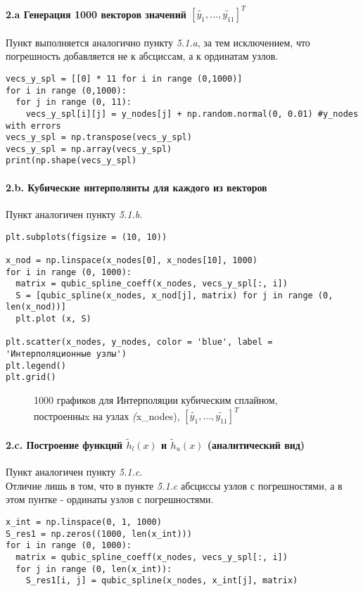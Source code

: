 \paragraph{2.a Генерация 1000 векторов значений $[\tilde{y_1}, ..., \tilde{y_{11}}]^T$ \\} 
\begin{flushleft}
Пункт выполняется аналогично пункту \textit{5.1.a}, за тем исключением, что погрешность добавляется не к абсциссам, а к ординатам узлов.
\end{flushleft}
\begin{lstlisting}
vecs_y_spl = [[0] * 11 for i in range (0,1000)]
for i in range (0,1000):
  for j in range (0, 11):
    vecs_y_spl[i][j] = y_nodes[j] + np.random.normal(0, 0.01) #y_nodes with errors 
vecs_y_spl = np.transpose(vecs_y_spl)
vecs_y_spl = np.array(vecs_y_spl)
print(np.shape(vecs_y_spl)
\end{lstlisting}
\paragraph{2.b. Кубические интерполянты для каждого из векторов \\ }
\begin{flushleft}
Пункт аналогичен пункту \textit{5.1.b}.
\end{flushleft}
\begin{lstlisting}
plt.subplots(figsize = (10, 10))

x_nod = np.linspace(x_nodes[0], x_nodes[10], 1000)
for i in range (0, 1000):
  matrix = qubic_spline_coeff(x_nodes, vecs_y_spl[:, i])
  S = [qubic_spline(x_nodes, x_nod[j], matrix) for j in range (0, len(x_nod))]
  plt.plot (x, S)

plt.scatter(x_nodes, y_nodes, color = 'blue', label = 'Интерполяционные узлы')
plt.legend()
plt.grid()
\end{lstlisting}
\clearpage
\begin{figure}[h]
\caption{1000 графиков для Интерполяции кубическим сплайном, построенныx на узлах \textit(x_nodes), $[\tilde{y_1}, ..., \tilde{y_{11}}]^T$}
\end{figure}
\paragraph{2.c. Построение функций  $\tilde{h}_l(x)$ и $\tilde{h}_u(x)$ (аналитический вид) \\ }
\begin{flushleft}
Пункт аналогичен пункту \textit{5.1.c}. \\
Отличие лишь в том, что в пункте \textit{5.1.c} абсциссы узлов с погрешностями, а в этом пунтке - ординаты узлов с погрешностями.
\end{flushleft}
\begin{lstlisting}
x_int = np.linspace(0, 1, 1000)
S_res1 = np.zeros((1000, len(x_int)))
for i in range (0, 1000):
  matrix = qubic_spline_coeff(x_nodes, vecs_y_spl[:, i])
  for j in range (0, len(x_int)):
    S_res1[i, j] = qubic_spline(x_nodes, x_int[j], matrix)
\end{lstlisting}
